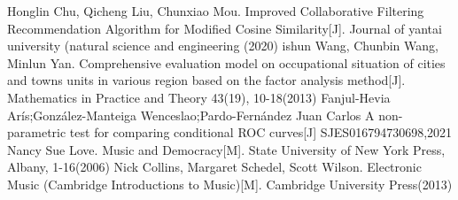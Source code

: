 \documentclass{mcmthesis}
\begin{document}
\begin{thebibliography}{99}%
	 Honglin Chu, Qicheng Liu, Chunxiao Mou. Improved Collaborative Filtering Recommendation Algorithm for Modified Cosine Similarity[J]. Journal of yantai university (natural science and engineering (2020)
	ishun Wang, Chunbin Wang, Minlun Yan. Comprehensive evaluation model on occupational situation of cities and towns units in various region based on the factor analysis method[J]. Mathematics in Practice and Theory 43(19), 10-18(2013)
	Fanjul-Hevia Arís;González-Manteiga Wenceslao;Pardo-Fernández Juan Carlos A non-parametric test for comparing conditional ROC curves[J]  SJES016794730698,2021
	Nancy Sue Love. Music and Democracy[M]. State University of New York Press, Albany, 1-16(2006)
	Nick Collins, Margaret Schedel, Scott Wilson. Electronic Music (Cambridge Introductions to Music)[M]. Cambridge University Press(2013)
\end{thebibliography}
\end{document}
